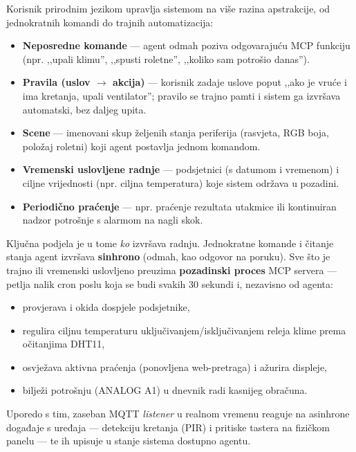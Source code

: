 \documentclass[11pt,a4paper]{article}
\begin{document}
Korisnik prirodnim jezikom upravlja sistemom na više razina apstrakcije, od jednokratnih
komandi do trajnih automatizacija:

\begin{itemize}[nosep]
      \item \textbf{Neposredne komande} --- agent odmah poziva odgovarajuću MCP funkciju
            (npr. ,,upali klimu'', ,,spusti roletne'', ,,koliko sam potrošio danas'').
      \item \textbf{Pravila (uslov $\rightarrow$ akcija)} --- korisnik zadaje uslove poput
            ,,ako je vruće i ima kretanja, upali ventilator''; pravilo se trajno pamti i
            sistem ga izvršava automatski, bez daljeg upita.
      \item \textbf{Scene} --- imenovani skup željenih stanja periferija (rasvjeta, RGB boja,
            položaj roletni) koji agent postavlja jednom komandom.
      \item \textbf{Vremenski uslovljene radnje} --- podsjetnici (s datumom i vremenom) i
            ciljne vrijednosti (npr. ciljna temperatura) koje sistem održava u pozadini.
      \item \textbf{Periodično praćenje} --- npr. praćenje rezultata utakmice ili kontinuiran
            nadzor potrošnje s alarmom na nagli skok.
\end{itemize}

Ključna podjela je u tome \emph{ko} izvršava radnju. Jednokratne komande i čitanje stanja
agent izvršava \textbf{sinhrono} (odmah, kao odgovor na poruku). Sve što je trajno ili
vremenski uslovljeno preuzima \textbf{pozadinski proces} MCP servera --- petlja nalik
cron poslu koja se budi svakih 30 sekundi i, nezavisno od agenta:
\begin{itemize}[nosep]
      \item provjerava i okida dospjele podsjetnike,
      \item regulira ciljnu temperaturu uključivanjem/isključivanjem releja klime prema
            očitanjima DHT11,
      \item osvježava aktivna praćenja (ponovljena web-pretraga) i ažurira displeje,
      \item bilježi potrošnju (ANALOG A1) u dnevnik radi kasnijeg obračuna.
\end{itemize}
Uporedo s tim, zaseban MQTT \emph{listener} u realnom vremenu reaguje na asinhrone događaje
s uređaja --- detekciju kretanja (PIR) i pritiske tastera na fizičkom panelu --- te ih
upisuje u stanje sistema dostupno agentu.
\end{document}
